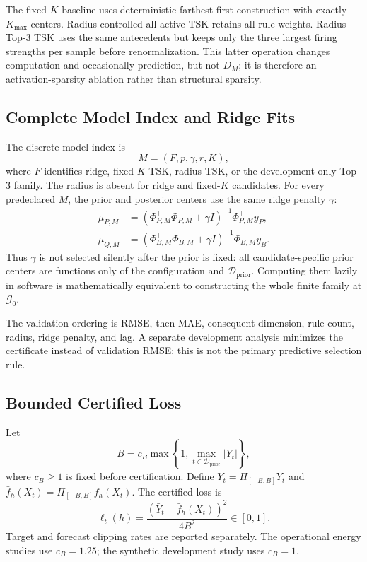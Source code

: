 The fixed-$K$ baseline uses deterministic farthest-first construction with exactly $K_{\max}$ centers. Radius-controlled all-active TSK retains all rule weights. Radius Top-3 TSK uses the same antecedents but keeps only the three largest firing strengths per sample before renormalization. This latter operation changes computation and occasionally prediction, but not $D_M$; it is therefore an activation-sparsity ablation rather than structural sparsity.

\subsection{Complete Model Index and Ridge Fits}
The discrete model index is
\begin{equation}
M=(F,p,\gamma,r,K),
\label{eq:model_index}
\end{equation}
where $F$ identifies ridge, fixed-$K$ TSK, radius TSK, or the development-only Top-3 family. The radius is absent for ridge and fixed-$K$ candidates. For every predeclared $M$, the prior and posterior centers use the same ridge penalty $\gamma$:
\begin{align}
\mu_{P,M}&=(\Phi_{P,M}^\top\Phi_{P,M}+\gamma I)^{-1}\Phi_{P,M}^\top y_P,\\
\mu_{Q,M}&=(\Phi_{B,M}^\top\Phi_{B,M}+\gamma I)^{-1}\Phi_{B,M}^\top y_B.
\label{eq:centers}
\end{align}
Thus $\gamma$ is not selected silently after the prior is fixed: all candidate-specific prior centers are functions only of the configuration and $\mathcal D_{\mathrm{prior}}$. Computing them lazily in software is mathematically equivalent to constructing the whole finite family at $\mathcal G_0$.

The validation ordering is RMSE, then MAE, consequent dimension, rule count, radius, ridge penalty, and lag. A separate development analysis minimizes the certificate instead of validation RMSE; this is not the primary predictive selection rule.

\subsection{Bounded Certified Loss}
Let
\begin{equation}
B=c_B\max\left\{1,\max_{t\in\mathcal D_{\mathrm{prior}}}|Y_t|\right\},
\label{eq:B}
\end{equation}
where $c_B\ge1$ is fixed before certification. Define $\bar Y_t=\Pi_{[-B,B]}Y_t$ and $\bar f_h(X_t)=\Pi_{[-B,B]}f_h(X_t)$. The certified loss is
\begin{equation}
\ell_t(h)=\frac{(\bar Y_t-\bar f_h(X_t))^2}{4B^2}\in[0,1].
\label{eq:loss}
\end{equation}
Target and forecast clipping rates are reported separately. The operational energy studies use $c_B=1.25$; the synthetic development study uses $c_B=1$.
